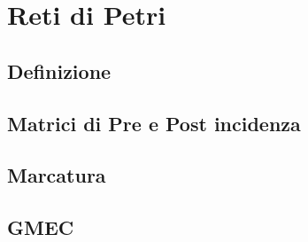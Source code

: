 \chapter{Reti di Petri}
\label{cap:cap1}
\lhead{\textbf{\rightmark}}

\newpage

\section{Definizione}
\label{sec:1.1}

\newpage

\section{Matrici di Pre e Post incidenza}
\label{sec:1.2}

\newpage

\section{Marcatura}
\label{sec:1.3}

\newpage

\section{GMEC}
\label{sec:1.4}

\newpage